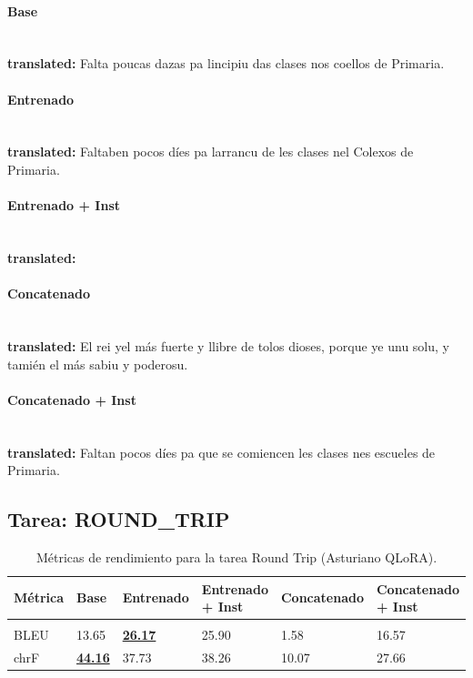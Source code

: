 \paragraph{Base}~\\
\textbf{translated:} Falta poucas dazas pa l\textquotesingle{}incipiu das clases nos coellos de Primaria.\\

\paragraph{Entrenado}~\\
\textbf{translated:} Faltaben pocos díes pa l\textquotesingle{}arrancu de les clases nel Colexos de Primaria.\\

\paragraph{Entrenado + Inst}~\\
\textbf{translated:} \\

\paragraph{Concatenado}~\\
\textbf{translated:} El rei ye\textquotesingle{}l más fuerte y llibre de tolos dioses, porque ye unu solu, y tamién el más sabiu y poderosu.\\

\paragraph{Concatenado + Inst}~\\
\textbf{translated:} Faltan pocos díes pa que se comiencen les clases nes escueles de Primaria.\\

\subsection{Tarea: ROUND\_TRIP}\label{tarea-round_trip}
\begin{longtable}[]{@{}llllll@{}}
\toprule\noalign{}
Métrica & Base & Entrenado & Entrenado + Inst & Concatenado & Concatenado + Inst \\
\midrule\noalign{}
\endhead
\bottomrule\noalign{}
\caption{Métricas de rendimiento para la tarea Round Trip (Asturiano QLoRA).}
\label{tab:metricas_round_trip_Asturiano QLoRA}}\\
\endlastfoot
BLEU & 13.65 & \textbf{\underline{26.17}} & 25.90 & 1.58 & 16.57 \\
chrF & \textbf{\underline{44.16}} & 37.73 & 38.26 & 10.07 & 27.66 \\
\end{longtable}

